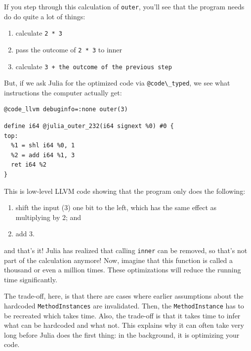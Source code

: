 \documentclass[
  notoc %
]{tufte-book}
\providecommand{\tightlist}{%
  \setlength{\itemsep}{0pt}\setlength{\parskip}{0pt}
}
\newcommand{\passthrough}[1]{#1}
\begin{document}
If you step through this calculation of \passthrough{\lstinline!outer!},
you'll see that the program needs do do quite a lot of things:

\begin{enumerate}
\def\labelenumi{\arabic{enumi}.}
\tightlist
\item
  calculate \passthrough{\lstinline!2 * 3!}
\item
  pass the outcome of \passthrough{\lstinline!2 * 3!} to inner
\item
  calculate
  \passthrough{\lstinline!3 + the outcome of the previous step!}
\end{enumerate}

But, if we ask Julia for the optimized code via
\passthrough{\lstinline!@code\_typed!}, we see what instructions the
computer actually get:

\begin{lstlisting}
@code_llvm debuginfo=:none outer(3)
\end{lstlisting}

\begin{lstlisting}[language=Output]
define i64 @julia_outer_232(i64 signext %0) #0 {
top:
  %1 = shl i64 %0, 1
  %2 = add i64 %1, 3
  ret i64 %2
}
\end{lstlisting}

This is low-level LLVM code showing that the program only does the
following:

\begin{enumerate}
\def\labelenumi{\arabic{enumi}.}
\tightlist
\item
  shift the input (3) one bit to the left, which has the same effect as
  multiplying by 2; and
\item
  add 3.
\end{enumerate}

and that's it! Julia has realized that calling
\passthrough{\lstinline!inner!} can be removed, so that's not part of
the calculation anymore! Now, imagine that this function is called a
thousand or even a million times. These optimizations will reduce the
running time significantly.

The trade-off, here, is that there are cases where earlier assumptions
about the hardcoded \passthrough{\lstinline!MethodInstances!} are
invalidated. Then, the \passthrough{\lstinline!MethodInstance!} has to
be recreated which takes time. Also, the trade-off is that it takes time
to infer what can be hardcoded and what not. This explains why it can
often take very long before Julia does the first thing: in the
background, it is optimizing your code.
\end{document}
